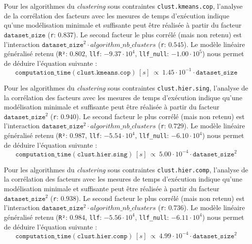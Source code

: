 			Pour les algorithmes du \textit{clustering} sous contraintes \texttt{clust.kmeans.cop}, l'analyse de la corrélation des facteurs avec les mesures de temps d'exécution indique qu'une modélisation minimale et suffisante peut être réalisée à partir du facteur $\texttt{dataset\_size}$ (\texttt{r}: $0.837$).
			Le second facteur le plus corrélé (mais non retenu) est l'interaction $\texttt{dataset\_size}^{2} \cdot algorithm\_nb\_clusters$ (\texttt{r}: $0.545$).
			Le modèle linéaire généralisé retenu (\texttt{R²}: $0.802$, \texttt{llf}: $-9.37 \cdot 10^{4}$, \texttt{llf\_null}: $-1.00 \cdot 10^{5}$) nous permet de déduire l'équation suivante :
			\begin{equation}
				\texttt{computation\_time}(\texttt{clust.kmeans.cop})~[s]~
				\propto~1.45 \cdot 10^{-1} \cdot \texttt{dataset\_size}
			\end{equation}
			
			Pour les algorithmes du \textit{clustering} sous contraintes \texttt{clust.hier.sing}, l'analyse de la corrélation des facteurs avec les mesures de temps d'exécution indique qu'une modélisation minimale et suffisante peut être réalisée à partir du facteur $\texttt{dataset\_size}^{2}$ (\texttt{r}: $0.940$).
			Le second facteur le plus corrélé (mais non retenu) est l'interaction $\texttt{dataset\_size}^{2} \cdot algorithm\_nb\_clusters$ (\texttt{r}: $0.729$).
			Le modèle linéaire généralisé retenu (\texttt{R²}: $0.987$, \texttt{llf}: $-5.54 \cdot 10^{4}$, \texttt{llf\_null}: $-6.10 \cdot 10^{4}$) nous permet de déduire l'équation suivante :
			\begin{equation}
				\texttt{computation\_time}(\texttt{clust.hier.sing})~[s]~
				\propto~5.00 \cdot 10^{-4} \cdot \texttt{dataset\_size}^{2}
			\end{equation}
			
			Pour les algorithmes du \textit{clustering} sous contraintes \texttt{clust.hier.comp}, l'analyse de la corrélation des facteurs avec les mesures de temps d'exécution indique qu'une modélisation minimale et suffisante peut être réalisée à partir du facteur $\texttt{dataset\_size}^{2}$ (\texttt{r}: $0.938$).
			Le second facteur le plus corrélé (mais non retenu) est l'interaction $\texttt{dataset\_size}^{2} \cdot algorithm\_nb\_clusters$ (\texttt{r}: $0.736$).
			Le modèle linéaire généralisé retenu (\texttt{R²}: $0.984$, \texttt{llf}: $-5.56 \cdot 10^{4}$, \texttt{llf\_null}: $-6.11 \cdot 10^{4}$) nous permet de déduire l'équation suivante :
			\begin{equation}
				\texttt{computation\_time}(\texttt{clust.hier.comp})~[s]~
				\propto~4.99 \cdot 10^{-4} \cdot \texttt{dataset\_size}^{2}
			\end{equation}

